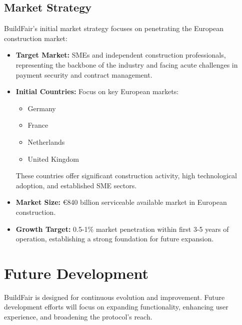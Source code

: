 \documentclass[12pt]{article}
\begin{document}
\subsection{Market Strategy}
BuildFair's initial market strategy focuses on penetrating the European construction market:

\begin{itemize}
    \item \textbf{Target Market:} SMEs and independent construction professionals, representing the backbone of the industry and facing acute challenges in payment security and contract management\cite{construction_standards}.
    
    \item \textbf{Initial Countries:} Focus on key European markets:
    \begin{itemize}
        \item Germany
        \item France
        \item Netherlands
        \item United Kingdom
    \end{itemize}
    These countries offer significant construction activity, high technological adoption, and established SME sectors\cite{european_market_report}.
    
    \item \textbf{Market Size:} €840 billion serviceable available market in European construction\cite{nextmsc_analysis}.
    
    \item \textbf{Growth Target:} 0.5-1\% market penetration within first 3-5 years of operation, establishing a strong foundation for future expansion.
\end{itemize}

\section{Future Development}
BuildFair is designed for continuous evolution and improvement. Future development efforts will focus on expanding functionality, enhancing user experience, and broadening the protocol's reach.
\end{document}
